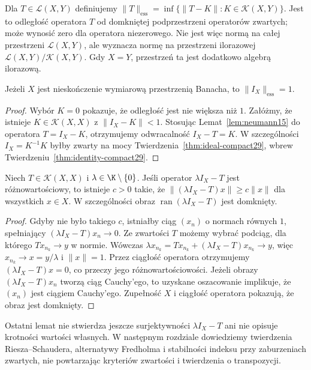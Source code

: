 \begin{definicja}
\label{def:essential-norm29}
Dla $T\in\mathcal L(X,Y)$ definiujemy
$\|T\|_{\mathrm{ess}}=
\inf\{\|T-K\|:K\in\mathcal K(X,Y)\}$.
Jest to odległość operatora $T$ od domkniętej
podprzestrzeni operatorów zwartych; może wynosić zero
dla operatora niezerowego. Nie jest więc normą
na całej przestrzeni $\mathcal L(X,Y)$, ale wyznacza normę
na przestrzeni ilorazowej
$\mathcal L(X,Y)/\mathcal K(X,Y)$. Gdy $X=Y$,
przestrzeń ta jest dodatkowo algebrą ilorazową.
\end{definicja}

\begin{twierdzenie}
\label{thm:essential-identity29}
Jeżeli $X$ jest nieskończenie wymiarową przestrzenią
Banacha, to $\|I_X\|_{\mathrm{ess}}=1$.
\end{twierdzenie}
\begin{proof}
Wybór $K=0$ pokazuje, że odległość jest nie większa
niż $1$. Załóżmy, że istnieje $K\in\mathcal K(X,X)$
z $\|I_X-K\|<1$. Stosując Lemat~\ref{lem:neumann15}
do operatora $T=I_X-K$, otrzymujemy odwracalność
$I_X-T=K$. W szczególności
$I_X=K^{-1}K$ byłby zwarty na mocy
Twierdzenia~\ref{thm:ideal-compact29}, wbrew
Twierdzeniu~\ref{thm:identity-compact29}.
\end{proof}

\begin{lemat}
\label{lem:compact-eigenvalue29}
Niech $T\in\mathcal K(X,X)$ i $\lambda\in\K\setminus\{0\}$.
Jeśli operator $\lambda I_X-T$ jest różnowartościowy,
to istnieje $c>0$ takie, że
$\|(\lambda I_X-T)x\|\ge c\|x\|$ dla wszystkich $x\in X$.
W szczególności obraz $\operatorname{ran}(\lambda I_X-T)$
jest domknięty.
\end{lemat}
\begin{proof}
Gdyby nie było takiego $c$, istniałby ciąg $(x_n)$
o normach równych $1$, spełniający
$(\lambda I_X-T)x_n\to0$. Ze zwartości $T$ możemy
wybrać podciąg, dla którego $Tx_{n_k}\to y$ w normie.
Wówczas $\lambda x_{n_k}=Tx_{n_k}+
(\lambda I_X-T)x_{n_k}\to y$, więc $x_{n_k}\to x=y/\lambda$
i $\|x\|=1$. Przez ciągłość operatora otrzymujemy
$(\lambda I_X-T)x=0$, co przeczy jego różnowartościowości.
Jeżeli obrazy $(\lambda I_X-T)x_n$ tworzą ciąg Cauchy'ego,
to uzyskane oszacowanie implikuje, że $(x_n)$ jest
ciągiem Cauchy'ego. Zupełność $X$ i ciągłość operatora
pokazują, że obraz jest domknięty.
\end{proof}

\begin{uwaga}
\label{rem:fredholm-next29}
Ostatni lemat nie stwierdza jeszcze surjektywności
$\lambda I_X-T$ ani nie opisuje krotności wartości
własnych. W następnym rozdziale dowiedziemy twierdzenia
Riesza--Schaudera, alternatywy Fredholma i stabilności
indeksu przy zaburzeniach zwartych, nie powtarzając
kryteriów zwartości i twierdzenia o transpozycji.
\end{uwaga}
